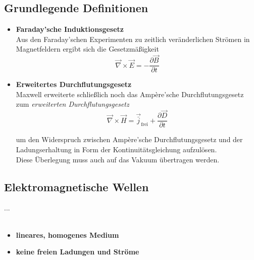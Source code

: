 \documentclass{article}
\begin{document}
\subsection{Grundlegende Definitionen}
	\begin{itemize}
		\item \textbf{Faraday'sche Induktionsgesetz}\\
		Aus den Faraday'schen Experimenten zu zeitlich veränderlichen Strömen in Magnetfeldern ergibt sich die Gesetzmäßigkeit
			\begin{equation}
				\vec{\nabla} \times \vec{E} = -\frac{\partial\vec{B}}{\partial t}
			\end{equation}


		\item \textbf{Erweitertes Durchflutungsgesetz}\\
		Maxwell erweiterte schließlich noch das Ampère'sche Durchflutungsgesetz zum \textit{erweiterten Durchflutungsgesetz}
			\begin{equation}
				\vec{\nabla} \times \vec{H} = \vec{\bar{j}}_\text{frei} + \frac{\partial \vec{D}}{\partial t}
			\end{equation}
		
		um den Widerspruch zwischen Ampère'sche Durchflutungsgesetz und der Ladungserhaltung in Form der Kontinuitätsgleichung aufzulösen.\\
	Diese Überlegung muss auch auf das Vakuum übertragen werden.
	\end{itemize}






\newpage


\subsection{Elektromagnetische Wellen}
...\\
\\
	\begin{itemize}
		\item \textbf{lineares, homogenes Medium}
		
		
		\item \textbf{keine freien Ladungen und Ströme}
	\end{itemize}
\end{document}
